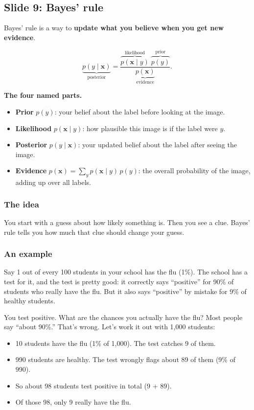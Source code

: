 \subsection*{Slide 9: Bayes' rule}

Bayes' rule is a way to \textbf{update what you believe when you get new evidence}.

\[
\underbrace{p(y\mid\mathbf{x})}_{\text{posterior}}
=\frac{\overbrace{p(\mathbf{x}\mid y)}^{\text{likelihood}}\;\overbrace{p(y)}^{\text{prior}}}{\underbrace{p(\mathbf{x})}_{\text{evidence}}}.
\]

\textbf{The four named parts.}
\begin{itemize}
\item \textbf{Prior} $p(y)$: your belief about the label before looking at the image.
\item \textbf{Likelihood} $p(\mathbf{x}\mid y)$: how plausible this image is if the label were $y$.
\item \textbf{Posterior} $p(y\mid\mathbf{x})$: your updated belief about the label after seeing the image.
\item \textbf{Evidence} $p(\mathbf{x})=\sum_y p(\mathbf{x}\mid y)\,p(y)$: the overall probability of the image, adding up over all labels.
\end{itemize}

\subsubsection*{The idea}

You start with a guess about how likely something is. Then you see a clue. Bayes' rule tells you how much that clue should change your guess.

\subsubsection*{An example}

Say 1 out of every 100 students in your school has the flu (1\%). The school has a test for it, and the test is pretty good: it correctly says ``positive'' for 90\% of students who really have the flu. But it also says ``positive'' by mistake for 9\% of healthy students.

You test positive. What are the chances you actually have the flu? Most people say ``about 90\%.'' That's wrong. Let's work it out with 1,000 students:

\begin{itemize}
  \item 10 students have the flu (1\% of 1,000). The test catches 9 of them.
  \item 990 students are healthy. The test wrongly flags about 89 of them (9\% of 990).
  \item So about 98 students test positive in total (9 + 89).
  \item Of those 98, only 9 really have the flu.
\end{itemize}

